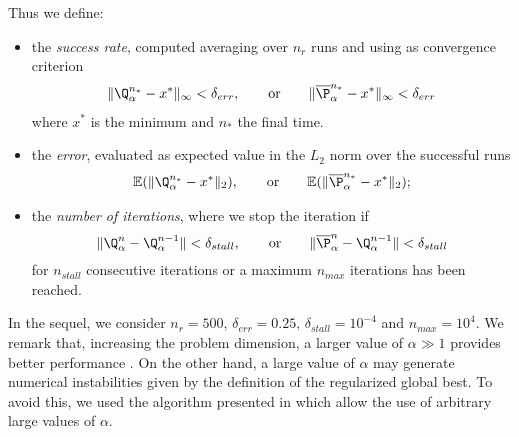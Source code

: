 \documentclass{ims9x6}
\renewcommand{\bar}{\overline}
\newcommand{\TE}{\mathcal{F}}
\begin{document}
Thus we define:
\begin{itemize}
\item  the \textit{success rate}, computed averaging over $n_r$ runs and using as convergence criterion 
\[
\begin{split}
\Vert\Q_\alpha^{n_*}-x^{\ast}\Vert_{\infty}< \delta_{err},\qquad {\rm or}\qquad \Vert\bar\P_\alpha^{n_*}-x^{\ast}\Vert_{\infty}< \delta_{err} 
  \end{split}
  \label{ConvCrit}
\]
where $x^{\ast}$ is the minimum and $n_*$ the final time.
 \item the \textit{error}, evaluated as expected value in the $L_2$ norm over the successful runs
\[
\begin{split}
\mathbb{E}(\Vert \Q_\alpha^{n_*}-x^{\ast} \Vert_2 ),\qquad {\rm or}\qquad \mathbb{E}(\Vert \bar\P_\alpha^{n_*}-x^{\ast} \Vert_2 );
  \end{split}
\] 
\item the \textit{number of iterations}, where we stop the iteration if
\[
\Vert \Q^{n}_{\alpha}-\Q^{n-1}_{\alpha}\Vert < \delta_{stall},\qquad {\rm or}\qquad \Vert \bar\P^{n}_{\alpha}-\Q^{n-1}_{\alpha}\Vert < \delta_{stall}
\]
for $n_{stall}$ consecutive iterations or a maximum $n_{max}$ iterations has been reached. 
\end{itemize}

In the sequel, we consider $n_r=500$, $\delta_{err}=0.25$, $\delta_{stall}=10^{-4}$ and $n_{max}=10^4$. 
We remark that, increasing the problem dimension, a larger value of $ \alpha \gg 1 $ provides better performance \cite{pinnau2017consensus,fhps20-2}. On the other hand, a large value of $ \alpha $ may generate numerical instabilities given by the definition of the regularized global best. To avoid this, we used the algorithm presented in \cite{fhps20-2} which allow the use of arbitrary large values of $\alpha$.
\end{document}
